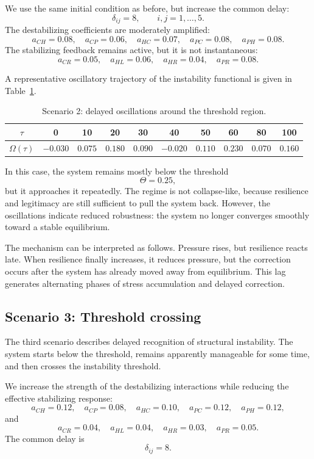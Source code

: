 \documentclass[11pt]{article}
\begin{document}
We use the same initial condition as before, but increase the common delay:
\[
\delta_{ij}=8,
\qquad i,j=1,\ldots,5.
\]
The destabilizing coefficients are moderately amplified:
\[
a_{CH}=0.08,\quad
a_{CP}=0.06,\quad
a_{HC}=0.07,\quad
a_{PC}=0.08,\quad
a_{PH}=0.08.
\]
The stabilizing feedback remains active, but it is not instantaneous:
\[
a_{CR}=0.05,\quad
a_{HL}=0.06,\quad
a_{HR}=0.04,\quad
a_{PR}=0.08.
\]

A representative oscillatory trajectory of the instability functional is given in Table~\ref{tab:omega_oscillatory}.

\begin{table}[h!]
	\centering
	\caption{Scenario 2: delayed oscillations around the threshold region.}
	\label{tab:omega_oscillatory}
	\begin{tabular}{cccccccccc}
		\toprule
		\(\tau\) & 0 & 10 & 20 & 30 & 40 & 50 & 60 & 80 & 100 \\
		\midrule
		\(\Omega(\tau)\) 
		& \(-0.030\) & \(0.075\) & \(0.180\) & \(0.090\) & \(-0.020\) & \(0.110\) & \(0.230\) & \(0.070\) & \(0.160\) \\
		\bottomrule
	\end{tabular}
\end{table}

In this case, the system remains mostly below the threshold
\[
\Theta=0.25,
\]
but it approaches it repeatedly. The regime is not collapse-like, because resilience and legitimacy are still sufficient to pull the system back. However, the oscillations indicate reduced robustness: the system no longer converges smoothly toward a stable equilibrium.

The mechanism can be interpreted as follows. Pressure rises, but resilience reacts late. When resilience finally increases, it reduces pressure, but the correction occurs after the system has already moved away from equilibrium. This lag generates alternating phases of stress accumulation and delayed correction.

\subsection{Scenario 3: Threshold crossing}

The third scenario describes delayed recognition of structural instability. The system starts below the threshold, remains apparently manageable for some time, and then crosses the instability threshold.

We increase the strength of the destabilizing interactions while reducing the effective stabilizing response:
\[
a_{CH}=0.12,\quad
a_{CP}=0.08,\quad
a_{HC}=0.10,\quad
a_{PC}=0.12,\quad
a_{PH}=0.12,
\]
and
\[
a_{CR}=0.04,\quad
a_{HL}=0.04,\quad
a_{HR}=0.03,\quad
a_{PR}=0.05.
\]
The common delay is
\[
\delta_{ij}=8.
\]
\end{document}
